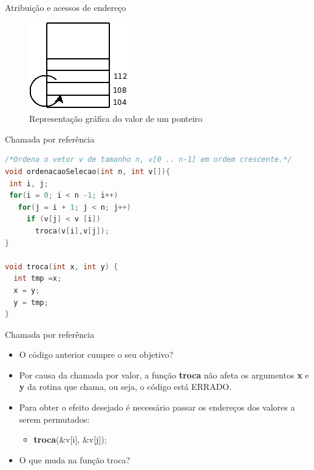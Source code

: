 \begin{frame}[plain,c]{Atribuição e acessos de endereço}  
  \begin{figure}[!htpb]
      \centering
      \includegraphics[width=.4\textwidth]{figs/fig_ponteiros/representacao_grafica_valor_ponteiro}
      \caption{Representação gráfica do valor de um ponteiro}
  \end{figure}
\end{frame}

\begin{frame}[fragile,c]{Chamada por referência}
\begin{lstlisting}[language=C]
/*Ordena o vetor v de tamanho n, v[0 .. n-1] em ordem crescente.*/
void ordenacaoSelecao(int n, int v[]){
 int i, j;
 for(i = 0; i < n -1; i++)
   for(j = i + 1; j < n; j++)
     if (v[j] < v [i])
       troca(v[i],v[j]); 
}

void troca(int x, int y) {
  int tmp =x;
  x = y;
  y = tmp;
}
\end{lstlisting}
\end{frame}

\begin{frame}[c]{Chamada por referência}
  \begin{itemize}[<+->]
    \item O código anterior cumpre o seu objetivo?
    \item Por causa da chamada por valor, a função \textbf{troca} não afeta os argumentos \textbf{x} e \textbf{y} da rotina que chama, ou seja, o código está \alert{ERRADO}.
    \item Para obter o efeito desejado é necessário passar os endereços dos valores a serem permutados:   
    \begin{itemize}
      \item \textbf{troca}(\&v[i], \&v[j]); 
    \end{itemize}
    \item O que muda na função troca?
  \end{itemize}
\end{frame}

